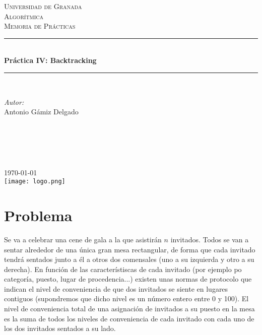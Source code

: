 \documentclass[11pt]{article}
\begin{document}
\begin{titlepage}
\newcommand{\HRule}{\rule{\linewidth}{0.5mm}}
\center
\textsc{\LARGE Universidad de Granada}\\[1.5cm] %
\textsc{\Large Algorítmica}\\[0.5cm] %
\textsc{\large Memoria de Prácticas}\\[0.5cm] %
\HRule \\[0.4cm]
{ \huge \bfseries Práctica IV: Backtracking}\\[0.4cm] %
\HRule \\[1.5cm]
\begin{minipage}{0.4\textwidth}
\begin{flushleft} \large
\emph{Autor:}\\
Antonio Gámiz Delgado\textsc{} %
\end{flushleft}
\end{minipage}
~
\begin{minipage}{0.4\textwidth}
\begin{flushright} \large
\emph{} \\
\textsc{} %
\end{flushright}
\end{minipage}\\[2cm]
{\large \today}\\[2cm] %
\texttt{[image: logo.png]}\\[1cm]
\vfill %
\end{titlepage}

\section{Problema}

Se va a celebrar una cene de gala a la que asistirán $n$ invitados. Todos se van a sentar alrededor de una única gran mesa rectangular, de forma que cada invitado tendrá sentados junto a él a otros dos comensales (uno a su izquierda y otro a su derecha). En función de las característiscas de cada invitado (por ejemplo po categoría, puesto, lugar de procedencia...) existen unas normas de protocolo que indican el nivel de conveniencia de que dos invitados se siente en lugares contiguos (supondremos que dicho nivel es un número entero entre 0 y 100). El nivel de conveniencia total de una asignación de invitados a su puesto en la mesa es la suma de todos los niveles de conveniencia de cada invitado con cada uno de los dos invitados sentados a su lado.
\end{document}
